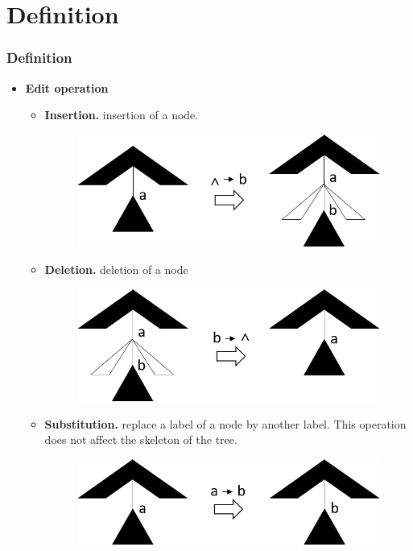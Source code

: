 \documentclass{beamer}
\begin{document}
\section{Definition}
\begin{frame}
\frametitle{Definition}
\begin{itemize}
\item \textbf{Edit operation}
\begin{itemize}
\item \textbf{Insertion.} insertion of a node.
\begin{figure}
	\includegraphics[width=0.4\linewidth]{Insertion}
	\label{Insertion} 
	\centering
\end{figure}
\item \textbf{Deletion.} deletion of a node
\begin{figure}
	\includegraphics[width=0.4\linewidth]{Delete}
	\label{Deletion} 
	\centering
\end{figure}
\item \textbf{Substitution.} replace a label of a node by another label. This operation does not affect the skeleton of the tree.
\begin{figure}
	\includegraphics[width=0.4\linewidth]{Replacement}
	\label{Substitution} 
	\centering
\end{figure}
\end{itemize}
\end{itemize}
\end{frame}

\end{document}
